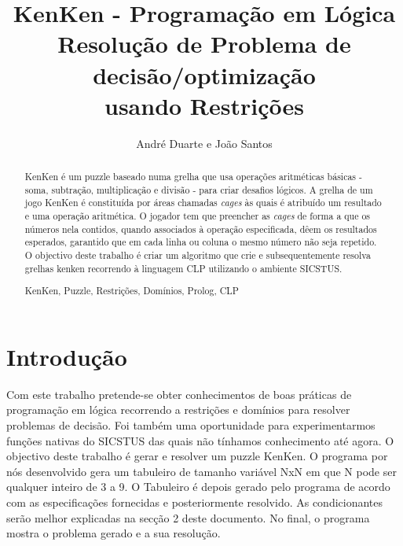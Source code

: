 \documentclass[runningheads,a4paper]{llncs}
\newcommand{\keywords}[1]{\par\addvspace\baselineskip
\noindent\keywordname\enspace\ignorespaces#1}
\begin{document}
\mainmatter

\title{KenKen - Programação em Lógica\\Resolução de Problema de decisão/optimização\\
usando Restrições}


\author{André Duarte e João Santos}




\maketitle

\begin{abstract}
KenKen é um puzzle baseado numa grelha que usa operações aritméticas básicas - soma, subtração, multiplicação e divisão - para criar desafios lógicos. A grelha de um jogo KenKen é constituída por áreas chamadas \textit{cages} às quais é atribuído um resultado e uma operação aritmética. O jogador tem que preencher as \textit{cages} de forma a que os números nela contidos, quando associados à operação especificada, dêem os resultados esperados, garantido que em cada linha ou coluna o mesmo número não seja repetido.
O objectivo deste trabalho é criar um algoritmo que crie e subsequentemente resolva grelhas kenken recorrendo à linguagem CLP utilizando o ambiente SICSTUS.
\keywords{KenKen, Puzzle, Restrições, Domínios, Prolog, CLP}
\end{abstract}

\section{Introdução}

Com este trabalho pretende-se obter conhecimentos de boas práticas de programação em lógica recorrendo a restrições e domínios para resolver problemas de decisão. Foi também uma oportunidade para experimentarmos funções nativas do SICSTUS das quais não tínhamos conhecimento até agora.
O objectivo deste trabalho é gerar e resolver um puzzle KenKen. O programa por nós desenvolvido gera um tabuleiro de tamanho variável NxN em que N pode ser qualquer inteiro de 3 a 9. O Tabuleiro é depois gerado pelo programa de acordo com as especificações fornecidas e posteriormente resolvido. As condicionantes serão melhor explicadas na secção 2 deste documento. No final, o programa mostra o problema gerado e a sua resolução.
\end{document}
